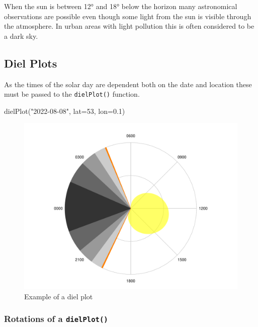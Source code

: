 \documentclass[
]{book}
\newenvironment{Shaded}{\begin{snugshade}}{\end{snugshade}}
\newcommand{\AttributeTok}[1]{\textcolor[rgb]{0.77,0.63,0.00}{#1}}
\newcommand{\DecValTok}[1]{\textcolor[rgb]{0.00,0.00,0.81}{#1}}
\newcommand{\FloatTok}[1]{\textcolor[rgb]{0.00,0.00,0.81}{#1}}
\newcommand{\FunctionTok}[1]{\textcolor[rgb]{0.00,0.00,0.00}{#1}}
\newcommand{\NormalTok}[1]{#1}
\newcommand{\StringTok}[1]{\textcolor[rgb]{0.31,0.60,0.02}{#1}}
\begin{document}
When the sun is between 12° and 18° below the horizon many astronomical observations are possible even though some light from the sun is visible through the atmosphere. In urban areas with light pollution this is often considered to be a dark sky.

\hypertarget{diel-plots}{%
\subsection{Diel Plots}\label{diel-plots}}

As the times of the solar day are dependent both on the date and location these must be passed to the \texttt{dielPlot()} function.

\begin{Shaded}
\begin{Highlighting}[]
\FunctionTok{dielPlot}\NormalTok{(}\StringTok{"2022{-}08{-}08"}\NormalTok{, }\AttributeTok{lat=}\DecValTok{53}\NormalTok{, }\AttributeTok{lon=}\FloatTok{0.1}\NormalTok{)}
\end{Highlighting}
\end{Shaded}

\begin{figure}

{\centering \includegraphics[width=0.9\linewidth]{_main_files/figure-latex/diel-plot-1-1} 

}

\caption{Example of a diel plot}\label{fig:diel-plot-1}
\end{figure}

\hypertarget{rotations-of-a-dielplot}{%
\subsubsection{\texorpdfstring{Rotations of a \texttt{dielPlot()}}{Rotations of a dielPlot()}}\label{rotations-of-a-dielplot}}
\end{document}
